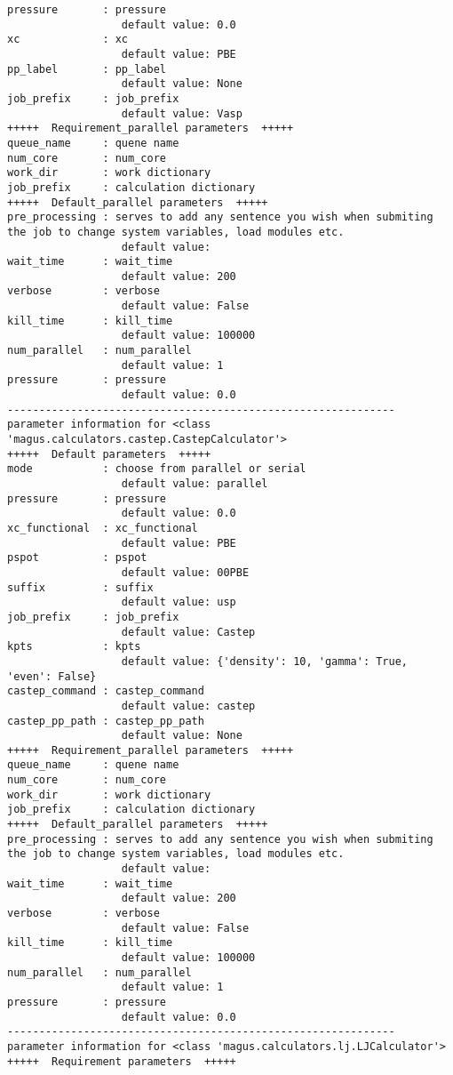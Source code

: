 \documentclass[12pt,oneside]{book}
\begin{document}
\begin{tcolorbox}
\begin{verbatim}
pressure       : pressure
                  default value: 0.0
xc             : xc
                  default value: PBE
pp_label       : pp_label
                  default value: None
job_prefix     : job_prefix
                  default value: Vasp
+++++  Requirement_parallel parameters  +++++
queue_name     : quene name
num_core       : num_core
work_dir       : work dictionary
job_prefix     : calculation dictionary
+++++  Default_parallel parameters  +++++
pre_processing : serves to add any sentence you wish when submiting the job to change system variables, load modules etc.
                  default value: 
wait_time      : wait_time
                  default value: 200
verbose        : verbose
                  default value: False
kill_time      : kill_time
                  default value: 100000
num_parallel   : num_parallel
                  default value: 1
pressure       : pressure
                  default value: 0.0
-------------------------------------------------------------
parameter information for <class 'magus.calculators.castep.CastepCalculator'>
+++++  Default parameters  +++++
mode           : choose from parallel or serial
                  default value: parallel
pressure       : pressure
                  default value: 0.0
xc_functional  : xc_functional
                  default value: PBE
pspot          : pspot
                  default value: 00PBE
suffix         : suffix
                  default value: usp
job_prefix     : job_prefix
                  default value: Castep
kpts           : kpts
                  default value: {'density': 10, 'gamma': True, 'even': False}
castep_command : castep_command
                  default value: castep
castep_pp_path : castep_pp_path
                  default value: None
+++++  Requirement_parallel parameters  +++++
queue_name     : quene name
num_core       : num_core
work_dir       : work dictionary
job_prefix     : calculation dictionary
+++++  Default_parallel parameters  +++++
pre_processing : serves to add any sentence you wish when submiting the job to change system variables, load modules etc.
                  default value: 
wait_time      : wait_time
                  default value: 200
verbose        : verbose
                  default value: False
kill_time      : kill_time
                  default value: 100000
num_parallel   : num_parallel
                  default value: 1
pressure       : pressure
                  default value: 0.0
-------------------------------------------------------------
parameter information for <class 'magus.calculators.lj.LJCalculator'>
+++++  Requirement parameters  +++++

\end{verbatim}
\end{tcolorbox}
\end{document}
